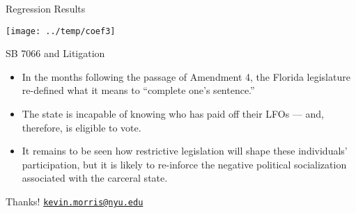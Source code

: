 \documentclass[
  ignorenonframetext,
  aspectratio=169]{beamer}
\providecommand{\tightlist}{%
  \setlength{\itemsep}{0pt}\setlength{\parskip}{0pt}}
\begin{document}
\begin{frame}{Regression Results}
\protect\hypertarget{regression-results-2}{}
\begin{center}\texttt{[image: ../temp/coef3]} \end{center}
\end{frame}

\begin{frame}{SB 7066 and Litigation}
\protect\hypertarget{sb-7066-and-litigation}{}
\begin{itemize}[<+->]
\tightlist
\item
  In the months following the passage of Amendment 4, the Florida
  legislature re-defined what it means to ``complete one's sentence.''
\end{itemize}

\begin{itemize}[<+->]
\tightlist
\item
  The state is incapable of knowing who has paid off their LFOs --- and,
  therefore, is eligible to vote.
\end{itemize}

\begin{itemize}[<+->]
\tightlist
\item
  It remains to be seen how restrictive legislation will shape these
  individuals' participation, but it is likely to re-inforce the
  negative political socialization associated with the carceral state.
\end{itemize}
\end{frame}

\begin{frame}{Thanks!}
\protect\hypertarget{thanks}{}
\href{mailto:kevin.morris@nyu.edu}{\nolinkurl{kevin.morris@nyu.edu}}
\end{frame}
\end{document}
